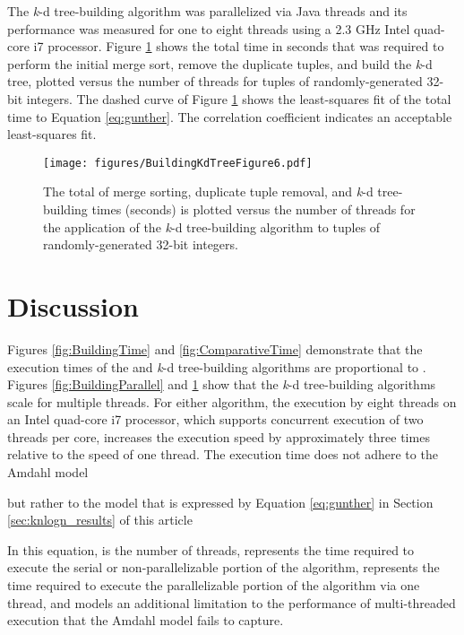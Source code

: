 \documentclass{sig-alternate}
\begin{document}
\newpage

The  \emph{k}-d tree-building algorithm was parallelized via Java threads and its performance was measured for one to eight threads using a 2.3 GHz Intel quad-core i7 processor.  Figure \ref{fig:ComparativeParallel} shows the total time in seconds that was required to perform the initial merge sort, remove the duplicate tuples, and build the \emph{k}-d tree, plotted versus the number of threads  for   tuples of randomly-generated 32-bit integers. The dashed curve of Figure \ref{fig:ComparativeParallel} shows the least-squares fit of the total time  to Equation \ref{eq:gunther}.  The correlation coefficient  indicates an acceptable least-squares fit.

\begin{figure}[h]
\centering
\centerline{\texttt{[image: figures/BuildingKdTreeFigure6.pdf]}}
\caption{The total of merge sorting, duplicate tuple removal, and \emph{k}-d tree-building times (seconds) is plotted versus the number of threads for the application of the  \emph{k}-d tree-building algorithm to    tuples of randomly-generated 32-bit integers.}
\label{fig:ComparativeParallel}
\end{figure}

\section{Discussion}
\label{sec:discussion}

Figures \ref{fig:BuildingTime} and \ref{fig:ComparativeTime} demonstrate that the execution times of the  and  \emph{k}-d tree-building algorithms are proportional to .  Figures \ref{fig:BuildingParallel} and \ref{fig:ComparativeParallel} show that the \emph{k}-d tree-building algorithms scale for multiple threads.  For either algorithm, the execution by eight threads on an Intel quad-core i7 processor, which supports concurrent execution of two threads per core, increases the execution speed by approximately three times relative to the speed of one thread.  The execution time  does not adhere to the Amdahl \cite{Amdahl} model

but rather to the model that is expressed by Equation \ref{eq:gunther} in Section \ref{sec:knlogn_results} of this article

In this equation,  is the number of threads,  represents the time required to execute the serial or non-parallelizable portion of the algorithm,  represents the time required to execute the parallelizable portion of the algorithm via one thread, and  models an additional limitation to the performance of multi-threaded execution that the Amdahl model fails to capture.
\end{document}
